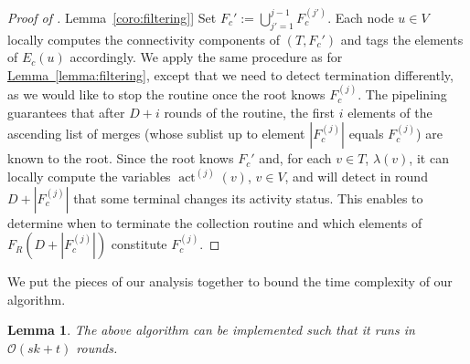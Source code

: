 \documentclass[letterpaper,11pt]{article}
\newtheorem{lemma}[theorem]{Lemma}
\newcommand{\namedref}[2]{\hyperref[#2]{#1~\ref*{#2}}}
\newcommand{\lemmaref}[1]{\namedref{Lemma}{#1}}
\newcommand{\BO}{\mathcal{O}}
\newcommand{\Comp}{\lambda}
\DeclareMathOperator{\act}{act}
\begin{document}
\begin{proof}[Proof of \lemmaref{coro:filtering}]
Set $F_c':=\bigcup_{j'=1}^{j-1}F_c^{(j')}$. Each node $u\in V$ locally
computes the connectivity components of $(T,F_c')$ and tags the elements of
$E_c(u)$ accordingly. We apply the same procedure as for
\lemmaref{lemma:filtering}, except that we need to detect termination
differently, as we would like to stop the routine once the root knows
$F_c^{(j)}$. The pipelining guarantees that after $D+i$ rounds of the routine,
the first $i$ elements of the ascending list of merges (whose sublist up to
element $|F_c^{(j)}|$ equals $F_c^{(j)}$) are known to the root. Since the root
knows $F_c'$ and, for each $v\in T$, $\Comp(v)$, it can locally compute the
variables $\act^{(j)}(v)$, $v\in V$, and will detect in round $D+|F_c^{(j)}|$ that
some terminal changes its activity status. This enables to determine when to
terminate the collection routine and which elements of $F_R(D+|F_c^{(j)}|)$
constitute $F_c^{(j)}$.
\end{proof}
We put the pieces of our analysis together to bound the time complexity of our
algorithm.
\begin{lemma}\label{lemma:2_time}
The above algorithm can be implemented such that it runs in $\BO(sk+t)$
rounds.
\end{lemma}
\end{document}
